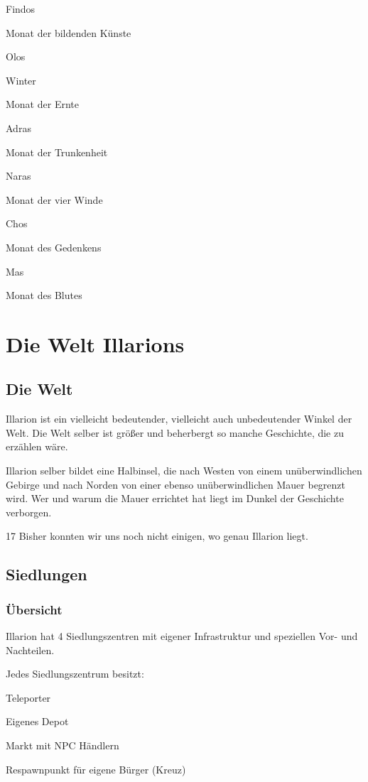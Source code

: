 \documentclass[a4paper,11pt]{book}
\begin{document}
Findos

Monat der bildenden Künste

Olos

Winter

Monat der Ernte

Adras

Monat der Trunkenheit

Naras

Monat der vier Winde

Chos

Monat des Gedenkens

Mas

Monat des Blutes

\chapter{Die Welt Illarions}

\section{Die Welt}

Illarion ist ein vielleicht bedeutender, vielleicht auch unbedeutender Winkel der Welt. Die Welt selber ist größer und beherbergt so manche Geschichte, die zu erzählen wäre.

Illarion selber bildet eine Halbinsel, die nach Westen von einem unüberwindlichen Gebirge und nach Norden von einer ebenso unüberwindlichen Mauer begrenzt wird. Wer und warum die Mauer errichtet hat liegt im Dunkel der Geschichte verborgen.

17 Bisher konnten wir uns noch nicht einigen, wo genau Illarion liegt.

\section{Siedlungen}

\subsection{Übersicht}

Illarion hat 4 Siedlungszentren mit eigener Infrastruktur und speziellen Vor- und Nachteilen.

Jedes Siedlungszentrum besitzt:

Teleporter

Eigenes Depot

Markt mit NPC Händlern

Respawnpunkt für eigene Bürger (Kreuz)
\end{document}
